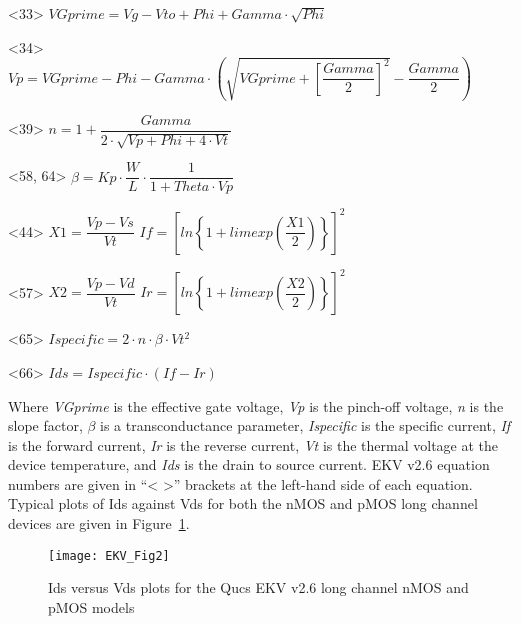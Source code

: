 <33> \hspace{10mm}  $VGprime = Vg-Vto+Phi+Gamma \cdot \sqrt{Phi}$

<34> \hspace{10mm}  $Vp=VGprime-Phi-Gamma \cdot \left(\sqrt{VGprime+\left[ \dfrac{Gamma}{2}\right]^{2} } -\dfrac{Gamma}{2} \right) $

<39> \hspace{10mm}  $n=1 + \dfrac{Gamma}{2 \cdot \sqrt{Vp+Phi+4 \cdot Vt}}$

<58, 64> \hspace{7mm} $\beta =Kp \cdot \dfrac{W}{L} \cdot \dfrac{1}{1+Theta \cdot Vp}$

<44>  \hspace{10mm}  $X1=\dfrac{Vp-Vs}{Vt}$  \hspace{5mm}  $If = \left[ ln\left\lbrace 1+limexp\left( \dfrac{X1}{2}\right) \right\rbrace \right]^{2} $

<57>  \hspace{10mm}  $X2=\dfrac{Vp-Vd}{Vt}$  \hspace{5mm}  $Ir = \left[ ln\left\lbrace 1+limexp\left( \dfrac{X2}{2}\right) \right\rbrace \right]^{2} $

<65> \hspace{10mm}   $Ispecific = 2 \cdot n \cdot \beta \cdot Vt^{2}$

<66> \hspace{10mm}   $ Ids = Ispecific \cdot \left( If-Ir \right ) $

\vspace{8mm}

Where \textit{VGprime} is the effective gate voltage, \textit{Vp} is
the pinch-off voltage, \textit{n} is the slope factor, $\beta$ is a
transconductance parameter, \textit{Ispecific} is the specific
current, \textit{If} is the forward current, \textit{Ir} is the
reverse current, \textit{Vt} is the thermal voltage at the device
temperature, and \textit{Ids} is the drain to source current.  EKV
v2.6 equation numbers are given in ``< >'' brackets at the left-hand
side of each equation.  Typical plots of Ids against Vds for both the
nMOS and pMOS long channel devices are given in Figure~\ref{fig:EKV2}.


\begin{figure}
  \centering
  \texttt{[image: EKV\_Fig2]}
  \caption{Ids versus Vds plots for the Qucs EKV v2.6 long channel nMOS and pMOS models}
  \label{fig:EKV2}
\end{figure} 



